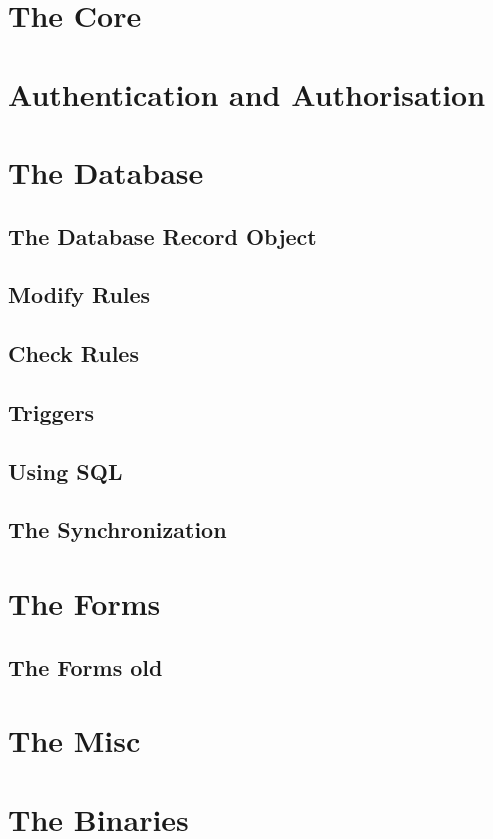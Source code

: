 \section{The Core}

\section{Authentication and Authorisation}

\section{The Database}

\subsection{The Database Record Object}

\subsection{Modify Rules}

\subsection{Check Rules}

\subsection{Triggers}

\subsection{Using SQL}

\subsection{The Synchronization}

\section{The Forms}

\subsection{The Forms old}

\section{The Misc}

\section{The Binaries}

